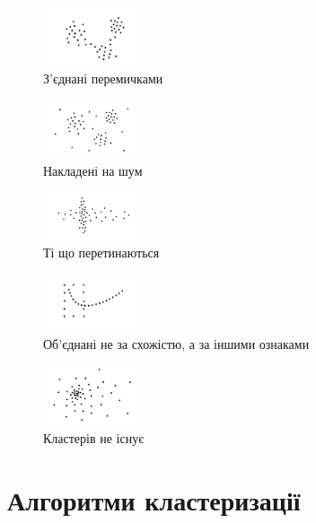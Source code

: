\documentclass[a4paper,14pt,russian]{extreport}
\begin{document}
\begin{figure}[h]
    \centering
    \includegraphics[width=0.25\textwidth]{4}
    \caption{З'єднані перемичками}
\end{figure}
	
	
\begin{figure}[h]
    \centering
    \includegraphics[width=0.25\textwidth]{5}
    \caption{Накладені на шум}
\end{figure}

\begin{figure}[h]
    \centering
    \includegraphics[width=0.25\textwidth]{6}
    \caption{Ті що перетинаються}
\end{figure}

\begin{figure}[h]
    \centering
    \includegraphics[width=0.25\textwidth]{7}
    \caption{Об'єднані не за схожістю, а за іншими ознаками}
\end{figure}

\begin{figure}[h]
    \centering
    \includegraphics[width=0.25\textwidth]{8}
    \caption{Кластерів не існує}
\end{figure}

\newpage



\chapter{Алгоритми кластеризації}
\end{document}
